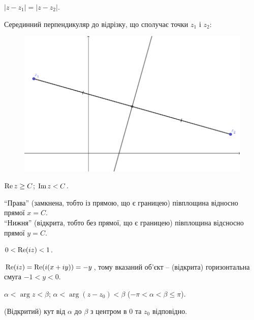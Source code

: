\begin{problem}
	$|z - z_1| = |z - z_2|$.
\end{problem}
\begin{solution}
	Серединний перпендикуляр до відрізку, що сполучає точки $z_1$ і $z_2$:
	\begin{figure}[H]
		\centering
		\includegraphics[width=.85\linewidth]{fig-9.png}
	\end{figure}
\end{solution}

\begin{problem}
	$\operatorname{Re} z \ge C$; $\operatorname{Im} z < C$.
\end{problem}
\begin{solution}
	``Права'' (замкнена, тобто із прямою, що є границею) півплощина відносно прямої $x = C$. \\

	``Нижня'' (відкрита, тобто без прямої, що є границею) півплощина відсносно прямої $y = C$.
\end{solution}

\begin{problem}
	$0 < \operatorname{Re} (iz) < 1$.
\end{problem}
\begin{solution}
	$\operatorname{Re} (iz) = \operatorname{Re} (i(x + iy)) = -y$, тому вказаний об'єкт -- (відкрита) горизонтальна смуга $-1 < y < 0$.
\end{solution}

\begin{problem}
	$\alpha < \arg z < \beta$; $\alpha < \arg (z - z_0) < \beta$ ($-\pi < \alpha < \beta \le \pi$).
\end{problem}
\begin{solution}
	(Відкритий) кут від $\alpha$ до $\beta$ з центром в $0$ та $z_0$ відповідно.
\end{solution}


